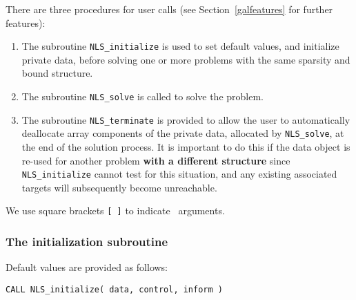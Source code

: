 \documentclass{galahad}
\newcommand{\packagename}{NLS}
\begin{document}

\galarguments
There are three procedures for user calls
(see Section~\ref{galfeatures} for further features):

\begin{enumerate}
\item The subroutine
      {\tt \packagename\_initialize}
      is used to set default values, and initialize private data,
      before solving one or more problems with the
      same sparsity and bound structure.
\item The subroutine
      {\tt \packagename\_solve}
      is called to solve the problem.
\item The subroutine
      {\tt \packagename\_terminate}
      is provided to allow the user to automatically deallocate array
       components of the private data, allocated by
       {\tt \packagename\_solve},
       at the end of the solution process.
       It is important to do this if the data object is re-used for another
       problem {\bf with a different structure}
       since {\tt \packagename\_initialize} cannot test for this situation,
       and any existing associated targets will subsequently become unreachable.
\end{enumerate}
We use square brackets {\tt [ ]} to indicate \optional\ arguments.


\subsubsection{The initialization subroutine}\label{subinit}
 Default values are provided as follows:
\vspace*{1mm}

\hspace{8mm}
{\tt CALL \packagename\_initialize( data, control, inform )}
\end{document}
